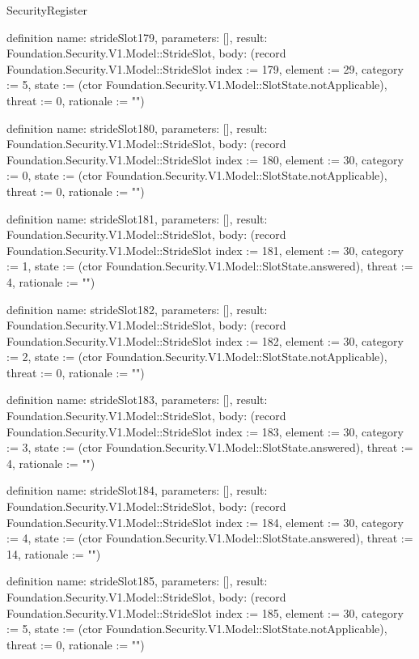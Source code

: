 \begin{lexlean}{SecurityRegister}
\begin{semanticmodule}
definition{
  name: strideSlot179,
  parameters: [],
  result: Foundation.Security.V1.Model::StrideSlot,
  body: (record Foundation.Security.V1.Model::StrideSlot {index := 179, element := 29, category := 5, state := (ctor Foundation.Security.V1.Model::SlotState.notApplicable), threat := 0, rationale := ""})
}

definition{
  name: strideSlot180,
  parameters: [],
  result: Foundation.Security.V1.Model::StrideSlot,
  body: (record Foundation.Security.V1.Model::StrideSlot {index := 180, element := 30, category := 0, state := (ctor Foundation.Security.V1.Model::SlotState.notApplicable), threat := 0, rationale := ""})
}

definition{
  name: strideSlot181,
  parameters: [],
  result: Foundation.Security.V1.Model::StrideSlot,
  body: (record Foundation.Security.V1.Model::StrideSlot {index := 181, element := 30, category := 1, state := (ctor Foundation.Security.V1.Model::SlotState.answered), threat := 4, rationale := ""})
}

definition{
  name: strideSlot182,
  parameters: [],
  result: Foundation.Security.V1.Model::StrideSlot,
  body: (record Foundation.Security.V1.Model::StrideSlot {index := 182, element := 30, category := 2, state := (ctor Foundation.Security.V1.Model::SlotState.notApplicable), threat := 0, rationale := ""})
}

definition{
  name: strideSlot183,
  parameters: [],
  result: Foundation.Security.V1.Model::StrideSlot,
  body: (record Foundation.Security.V1.Model::StrideSlot {index := 183, element := 30, category := 3, state := (ctor Foundation.Security.V1.Model::SlotState.answered), threat := 4, rationale := ""})
}

definition{
  name: strideSlot184,
  parameters: [],
  result: Foundation.Security.V1.Model::StrideSlot,
  body: (record Foundation.Security.V1.Model::StrideSlot {index := 184, element := 30, category := 4, state := (ctor Foundation.Security.V1.Model::SlotState.answered), threat := 14, rationale := ""})
}

definition{
  name: strideSlot185,
  parameters: [],
  result: Foundation.Security.V1.Model::StrideSlot,
  body: (record Foundation.Security.V1.Model::StrideSlot {index := 185, element := 30, category := 5, state := (ctor Foundation.Security.V1.Model::SlotState.notApplicable), threat := 0, rationale := ""})
}


\end{semanticmodule}
\end{lexlean}
